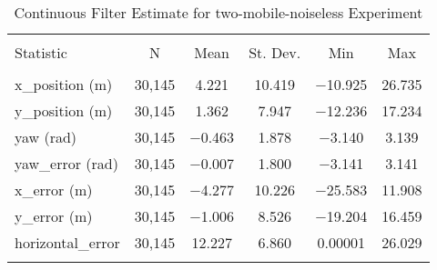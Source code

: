 
\begin{table}[h] \centering 
  \caption{Continuous Filter Estimate for two-mobile-noiseless Experiment} 
  \label{tab:two_mobile_noiseless_continuous_summary} 
\begin{tabular}{@{\extracolsep{5pt}}lccccc} 
\\[-1.8ex]\hline 
\hline \\[-1.8ex] 
Statistic & \multicolumn{1}{c}{N} & \multicolumn{1}{c}{Mean} & \multicolumn{1}{c}{St. Dev.} & \multicolumn{1}{c}{Min} & \multicolumn{1}{c}{Max} \\ 
\hline \\[-1.8ex] 
x\_position (m) & 30,145 & \num{4.221} & \num{10.419} & \num{-10.925} & \num{26.735} \\ 
y\_position (m) & 30,145 & \num{1.362} & \num{7.947} & \num{-12.236} & \num{17.234} \\ 
yaw (rad) & 30,145 & \num{-0.463} & \num{1.878} & \num{-3.140} & \num{3.139} \\ 
yaw\_error (rad) & 30,145 & \num{-0.007} & \num{1.800} & \num{-3.141} & \num{3.141} \\ 
x\_error (m) & 30,145 & \num{-4.277} & \num{10.226} & \num{-25.583} & \num{11.908} \\ 
y\_error (m) & 30,145 & \num{-1.006} & \num{8.526} & \num{-19.204} & \num{16.459} \\ 
horizontal\_error & 30,145 & \num{12.227} & \num{6.860} & \num{0.00001} & \num{26.029} \\ 
\hline \\[-1.8ex] 
\end{tabular} 
\end{table} 
